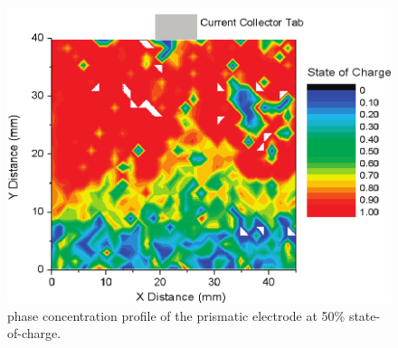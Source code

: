 \documentclass[journal=cmatex,manuscript=perspective]{achemso}
\begin{document}
\begin{figure}
  \includegraphics[width=\textwidth]{liu2010.png}
  \caption{ phase concentration profile of the prismatic
    electrode at 50\% state-of-charge.\cite{liu2010}}
  \label{figure:liu2010}
\end{figure}
\end{document}

